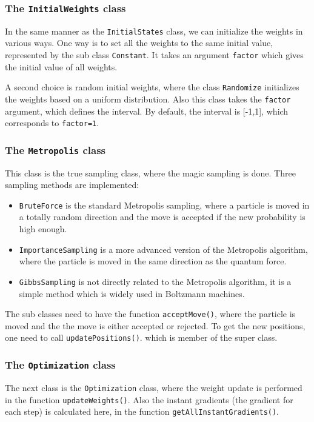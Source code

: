 \subsubsection{The \texttt{InitialWeights} class}
In the same manner as the \texttt{InitialStates} class, we can initialize the weights in various ways. One way is to set all the weights to the same initial value, represented by the sub class \texttt{Constant}. It takes an argument \texttt{factor} which gives the initial value of all weights.

A second choice is random initial weights, where the class \texttt{Randomize} initializes the weights based on a uniform distribution. Also this class takes the \texttt{factor} argument, which defines the interval. By default, the interval is [-1,1], which corresponds to \texttt{factor=1}.

\subsubsection{The \texttt{Metropolis} class}
This class is the true sampling class, where the magic sampling is done. Three sampling methods are implemented:
\begin{itemize}
	\item \texttt{BruteForce} is the standard Metropolis sampling, where a particle is moved in a totally random direction and the move is accepted if the new probability is high enough.

	\item \texttt{ImportanceSampling} is a more advanced version of the Metropolis algorithm, where the particle is moved in the same direction as the quantum force.
	
	\item \texttt{GibbsSampling} is not directly related to the Metropolis algorithm, it is a simple method which is widely used in Boltzmann machines.
\end{itemize}
The sub classes need to have the function \texttt{acceptMove()}, where the particle is moved and the the move is either accepted or rejected. To get the new positions, one need to call \texttt{updatePositions()}. which is member of the super class. 

\subsubsection{The \texttt{Optimization} class}
The next class is the \texttt{Optimization} class, where the weight update is performed in the function \texttt{updateWeights()}. Also the instant gradients (the gradient for each step) is calculated here, in the function \texttt{getAllInstantGradients()}.

